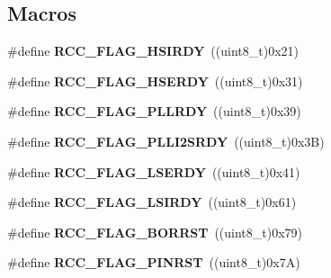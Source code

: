 \subsection*{Macros}
\begin{DoxyCompactItemize}
\item 
\mbox{\label{group___r_c_c___flag_ga827d986723e7ce652fa733bb8184d216}} 
\#define {\bfseries R\+C\+C\+\_\+\+F\+L\+A\+G\+\_\+\+H\+S\+I\+R\+DY}~((uint8\+\_\+t)0x21)
\item 
\mbox{\label{group___r_c_c___flag_ga173edf47bec93cf269a0e8d0fec9997c}} 
\#define {\bfseries R\+C\+C\+\_\+\+F\+L\+A\+G\+\_\+\+H\+S\+E\+R\+DY}~((uint8\+\_\+t)0x31)
\item 
\mbox{\label{group___r_c_c___flag_gaf82d8afb18d9df75db1d6c08b9c50046}} 
\#define {\bfseries R\+C\+C\+\_\+\+F\+L\+A\+G\+\_\+\+P\+L\+L\+R\+DY}~((uint8\+\_\+t)0x39)
\item 
\mbox{\label{group___r_c_c___flag_ga31e67a9f19cf673acf196d19f443f3d5}} 
\#define {\bfseries R\+C\+C\+\_\+\+F\+L\+A\+G\+\_\+\+P\+L\+L\+I2\+S\+R\+DY}~((uint8\+\_\+t)0x3\+B)
\item 
\mbox{\label{group___r_c_c___flag_gac9fb963db446c16e46a18908f7fe1927}} 
\#define {\bfseries R\+C\+C\+\_\+\+F\+L\+A\+G\+\_\+\+L\+S\+E\+R\+DY}~((uint8\+\_\+t)0x41)
\item 
\mbox{\label{group___r_c_c___flag_ga8c5e4992314d347597621bfe7ab10d72}} 
\#define {\bfseries R\+C\+C\+\_\+\+F\+L\+A\+G\+\_\+\+L\+S\+I\+R\+DY}~((uint8\+\_\+t)0x61)
\item 
\mbox{\label{group___r_c_c___flag_ga23d5211abcdf0e397442ca534ca04bb4}} 
\#define {\bfseries R\+C\+C\+\_\+\+F\+L\+A\+G\+\_\+\+B\+O\+R\+R\+ST}~((uint8\+\_\+t)0x79)
\item 
\mbox{\label{group___r_c_c___flag_gabfc3ab5d4a8a94ec1c9f38794ce37ad6}} 
\#define {\bfseries R\+C\+C\+\_\+\+F\+L\+A\+G\+\_\+\+P\+I\+N\+R\+ST}~((uint8\+\_\+t)0x7\+A)
\item 
\mbox{\label{group___r_c_c___flag_ga39ad309070f416720207eece5da7dc2c}} 

\end{DoxyCompactItemize}
